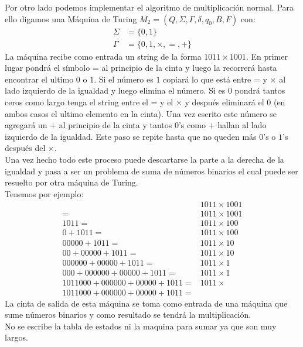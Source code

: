 \documentclass[spanish, fleqn]{article}
\begin{document}
\begin{enumerate}
		Por otro lado podemos implementar el algoritmo de multiplicación 
		normal. Para ello digamos una Máquina de Turing $M_2 = (Q, \Sigma, 
		\Gamma, \delta, q_0, B, F)$ con:
		\begin{align*}
			\Sigma &= \{0, 1\}\\
			\Gamma &= \{0, 1, \times, =, +\}
		\end{align*}
		La máquina recibe como entrada un string de la forma $1011\times 1001$.
		En primer lugar pondrá el símbolo = al principio de la cinta y luego la
		recorrerá hasta encontrar el ultimo $0$ o $1$. Si el número es $1$
		copiará lo que está entre = y $\times$ al lado izquierdo de la igualdad
		y luego elimina el número. Si es $0$ pondrá tantos ceros como largo
		tenga el string entre el = y el $\times$ y después eliminará el $0$
		(en ambos casos el ultimo elemento en la cinta). Una vez escrito este
		número se agregará un $+$ al principio de la cinta y tantos $0$'s como
		$+$ hallan al lado izquierdo de la igualdad. Este paso se repite hasta
		que no queden más $0$'s o $1$'s después del $\times$.\\
		Una vez hecho todo este proceso puede descartarse la parte a la derecha
		de la igualdad y pasa a ser un problema de suma de números binarios el
		cual puede ser resuelto por otra máquina de Turing.\\
		Tenemos por ejemplo:
		\begin{align*}
			&1011\times 1001 \\
			=&1011\times 1001 \\
			1011=&1011\times 100 \\
			0+1011=&1011\times 100 \\
			00000+1011=&1011\times 10 \\
			00+00000+1011=&1011\times 10 \\
			000000+00000+1011=&1011\times 1 \\
			000+000000+00000+1011=&1011\times 1 \\
			1011000+000000+00000+1011=&1011\times \\
			1011000+000000+00000+1011=&
		\end{align*}
		La cinta de salida de esta máquina se toma como entrada de una máquina
		que sume números binarios y como resultado se tendrá la multiplicación.
		\\ No se escribe la tabla de estados ni la maquina para sumar ya que
		son muy largos.


\end{enumerate}
\end{document}
